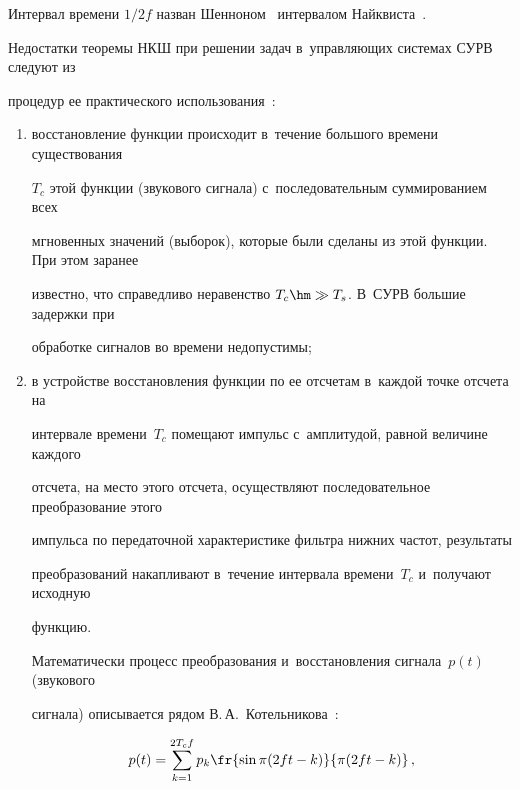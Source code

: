   


  \smallskip


  


  Интервал времени $1/2 f$ назван Шенноном~\cite{4-m} интервалом Найквиста~\cite{5-m}.


  


  Недостатки теоремы НКШ при решении задач в~управляющих системах СУРВ следуют из 


процедур ее практического использования~\cite{4-m}:


  \begin{enumerate}[(1)]


  \item  восстановление функции происходит в~течение большого времени существования 


$T_c$ этой функции (звукового сигнала) с~последовательным суммированием всех 


мгновенных значений (выборок), которые были сделаны из этой функции. При этом заранее 


известно, что справедливо неравенство $T_c\hm\gg T_s$. В~СУРВ большие задержки при 


обработке сигналов во времени недопустимы;


  \item в устройстве восстановления функции по ее отсчетам в~каждой точке отсчета на 


интервале времени~$T_c$ помещают импульс с~амплитудой, равной величине каждого 


отсчета, на место этого отсчета, осуществляют последовательное преобразование этого 


импульса по передаточной характеристике фильтра нижних частот, результаты 


преобразований накапливают в~течение интервала времени~$T_c$ и~получают исходную 


функцию.


  


  Математически процесс преобразования и~восстановления сигнала~$p(t)$ (звукового 


сигнала) описывается рядом В.\,А.~Котельникова~\cite{5-m, 6-m}:


  \begin{equation}


  p(t)= \sum\limits_{k=1}^{2T_cf} p_k \fr{\sin \pi(2ft-k)}{\pi(2ft-k)}\,,


  \label{e2-m}



\end{equation}
\end{enumerate}
